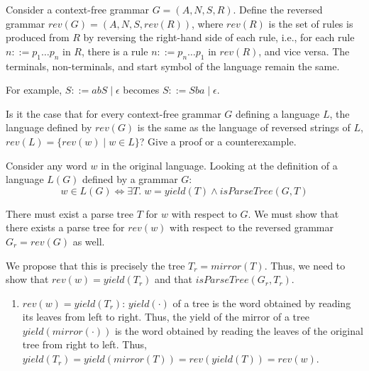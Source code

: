 \begin{exercise}{}
  
  Consider a context-free grammar \(G = (A, N, S, R)\). Define the reversed
  grammar \(rev(G) = (A, N, S, rev(R))\), where \(rev(R)\) is the set of rules
  is produced from \(R\) by reversing the right-hand side of each rule, i.e.,
  for each rule \(n ::= p_1 \ldots p_n\) in \(R\), there is a rule \(n ::=
  p_n \ldots p_1\) in \(rev(R)\), and vice versa. The terminals,
  non-terminals, and start symbol of the language remain the same.

  For example, \(S ::= abS \mid \epsilon\) becomes \(S ::= Sba \mid \epsilon\).

  Is it the case that for every context-free grammar \(G\) defining a language
  \(L\), the language defined by \(rev(G)\) is the same as the language of
  reversed strings of \(L\), \(rev(L) = \{rev(w) \mid w \in L\}\)? Give a proof
  or a counterexample.

  \begin{solution}

    Consider any word \(w\) in the original language. Looking at the definition
    of a language \(L(G)\) defined by a grammar \(G\):
    \begin{equation*}
      w \in L(G) \iff \exists T.\; w = yield(T) \land isParseTree(G, T) 
    \end{equation*}

    There must exist a parse tree \(T\) for \(w\) with respect to \(G\). We must
    show that there exists a parse tree for \(rev(w)\) with respect to the
    reversed grammar \(G_r = rev(G)\) as well.

    We propose that this is precisely the tree \(T_r = mirror(T)\). Thus, we
    need to show that \(rev(w) = yield(T_r)\) and that \(isParseTree(G_r,
    T_r)\).

    \begin{enumerate}
      \item \(rev(w) = yield(T_r)\): \(yield(\cdot)\) of a tree is the word
      obtained by reading its leaves from left to right. Thus, the yield of the
      mirror of a tree \(yield(mirror(\cdot))\) is the word obtained by reading
      the leaves of the original tree from right to left. Thus, \(yield(T_r) =
      yield(mirror(T)) = rev(yield(T)) = rev(w)\).


\end{enumerate}
\end{solution}
\end{exercise}
